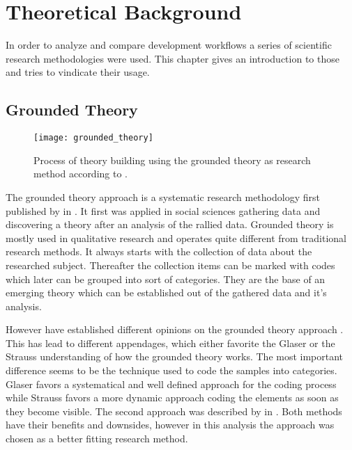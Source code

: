 \chapter{Theoretical Background} %
\label{chap:theoretical background}

In order to analyze and compare development workflows a series of scientific
research methodologies were used. This chapter gives an introduction to those
and tries to vindicate their usage.

\section{Grounded Theory} %

\begin{figure}[htbp]
  \centering
  \texttt{[image: grounded\_theory]}
  \caption{Process of theory building using the grounded theory as research
    method according to \citeauthor{Strauss1990} \cite{Pandit1996}.}
\end{figure}

The grounded theory approach is a systematic research methodology first
published by \textcite{Glaser1967} in \citeyear{Glaser1967}. It first was
applied in social sciences gathering data and discovering a theory after an
analysis of the rallied data. Grounded theory is mostly used in qualitative
research and operates quite different from traditional research methods. It
always starts with the collection of data about the researched subject.
Thereafter the collection items can be marked with codes which later can be
grouped into sort of categories. They are the base of an emerging theory which
can be established out of the gathered data and it's analysis.

However \citeauthor{Glaser1967} have established different opinions on the
grounded theory approach \cite{Heath2004}. This has lead to different
appendages, which either favorite the Glaser or the Strauss understanding of
how the grounded theory works. The most important difference seems to be the
technique used to code the samples into categories. Glaser favors a
systematical and well defined approach for the coding process while Strauss
favors a more dynamic approach coding the elements as soon as they become
visible. The second approach was described by \textcite{Strauss1990} in
\citeyear{Strauss1990}. Both methods have their benefits and downsides, however
in this analysis the \citeauthor{Strauss1990} approach was chosen as a better
fitting research method.

